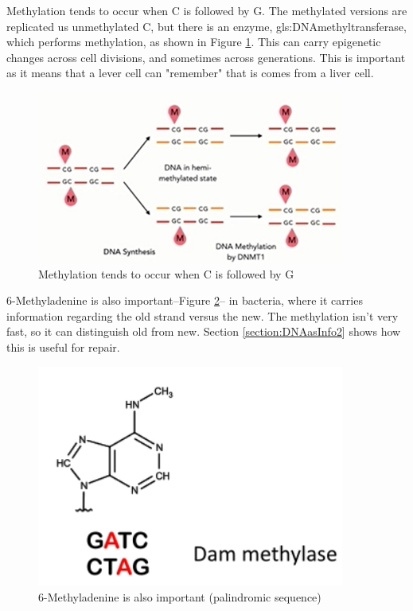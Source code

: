 \documentclass[]{article}
\begin{document}
Methylation tends to occur when C is followed by G. The methylated versions are replicated us unmethylated C, but there is an enzyme, \gls{gls:DNAmethyltransferase}, which performs methylation, as shown in Figure \ref{fig:5-methylcytosine-in-action}. This can carry epigenetic changes across cell divisions, and sometimes across generations. This is important as it means that a lever cell can "remember" that is comes from a liver cell.
\begin{figure}[H]
	\caption{Methylation tends to occur when C is followed by G } \label{fig:5-methylcytosine-in-action} 
	\includegraphics[width=0.9\textwidth]{5-methylcytosine-in-action}
\end{figure}

6-Methyladenine is also important--Figure \ref{fig:6-Methyladenine}-- in bacteria, where it carries information regarding the old strand versus the new. The methylation isn't very fast, so it can distinguish old from new. Section \ref{section:DNAasInfo2} shows how this is useful for repair.

\begin{figure}[H]
	\caption{6-Methyladenine is also important (palindromic sequence)} \label{fig:6-Methyladenine} 
	\includegraphics[width=0.9\textwidth]{6-Methyladenine}
\end{figure}
\end{document}
